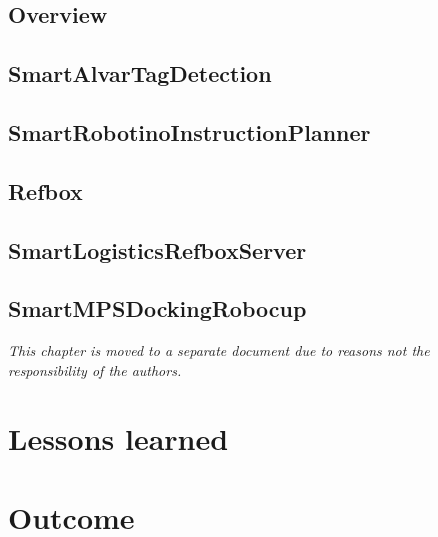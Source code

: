 \documentclass[12pt]{report}
\begin{document}
\section{Overview}
	
	
\section{SmartAlvarTagDetection}
	
	
\section{SmartRobotinoInstructionPlanner}
	

\section{Refbox}
	

\section{SmartLogisticsRefboxServer}
	
	
\section{SmartMPSDockingRobocup}
\textit{This chapter is moved to a separate document due to reasons not the responsibility of the authors.}	

\chapter{Lessons learned}
    

\chapter{Outcome}
    

\printbibliography
\end{document}
